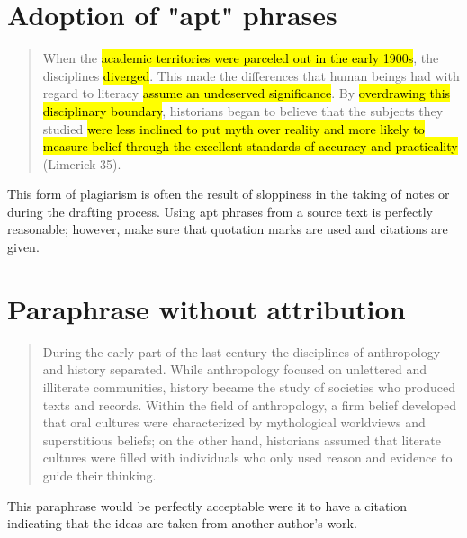 \section{Adoption of "apt" phrases}

\begin{Spacing}{1.5}
\begin{quote}
When the \hl{academic territories were parceled out in the early 1900s}, the disciplines \hl{diverged}. This made the differences that human beings had with regard to literacy \hl{assume an undeserved significance}. By \hl{overdrawing this disciplinary boundary}, historians began to believe that the subjects they studied \hl{were less inclined to put myth over reality and more likely to measure belief through the excellent standards of accuracy and practicality} (Limerick 35). 
\end{quote}
\end{Spacing}

 This form of plagiarism is often the result of sloppiness in the taking of notes or during the drafting process. Using apt phrases from a source text is perfectly reasonable; however, make sure that quotation marks are used and citations are given.

\section{Paraphrase without attribution}
\begin{Spacing}{1.5}
\begin{quote}
During the early part of the last century the disciplines of anthropology and history separated. While anthropology focused on unlettered and illiterate communities, history became the study of societies who produced texts and records. Within the field of anthropology, a firm belief developed that oral cultures were characterized by mythological worldviews and superstitious beliefs; on the other hand, historians assumed that literate cultures were filled with individuals who only used reason and evidence to guide their thinking.
\end{quote}
\end{Spacing}

 This paraphrase would be perfectly acceptable were it to have a citation indicating that the ideas are taken from another author's work.




